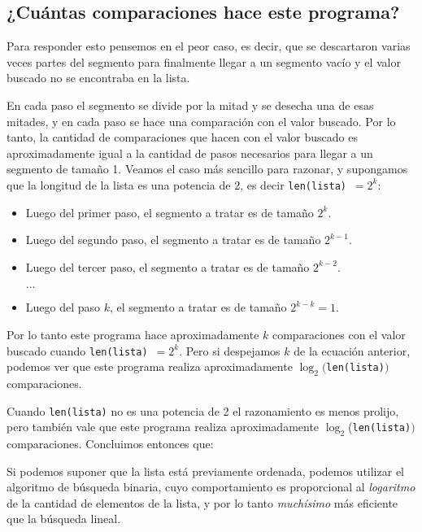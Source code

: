 
\subsection*{¿Cuántas comparaciones hace este programa?}

Para responder esto pensemos en el peor caso, es decir, que se descartaron
varias veces partes del segmento para finalmente llegar a un segmento vacío y
el valor buscado no se encontraba en la lista.

En cada paso el segmento se divide por la mitad y se desecha una de esas
mitades, y en cada paso se hace una comparación con el valor buscado. Por lo
tanto, la cantidad de comparaciones que hacen con el valor buscado es
aproximadamente igual a la cantidad de pasos necesarios para llegar a un
segmento de tamaño 1.
Veamos el caso más sencillo para razonar, y supongamos que la longitud de la
lista es una potencia de 2, es decir \lstinline+len(lista)+~$= 2^k$:

\begin{itemize}
\item Luego del primer paso, el segmento a tratar es de tamaño $2^k$.
\item Luego del segundo paso, el segmento a tratar es de tamaño $2^{k-1}$.
\item Luego del tercer paso, el segmento a tratar es de tamaño $2^{k-2}$.

$\ldots$

\item Luego del paso $k$, el segmento a tratar es de tamaño $2^{k-k}=1$.
\end{itemize}

Por lo tanto este programa hace aproximadamente $k$ comparaciones con el valor
buscado cuando \lstinline+len(lista)+~$= 2^k$.
Pero si despejamos $k$ de la ecuación anterior, podemos ver que este programa
realiza aproximadamente $\log_2($\lstinline+len(lista)+$)$ comparaciones.

Cuando \lstinline+len(lista)+ no es una potencia de 2 el razonamiento es menos
prolijo, pero también vale que este programa realiza aproximadamente
$\log_2$(\lstinline+len(lista)+$)$ comparaciones. Concluimos entonces que:

\begin{observacion}
Si podemos suponer que la lista está previamente ordenada, podemos utilizar el
algoritmo de búsqueda binaria, cuyo comportamiento es proporcional al
\emph{logaritmo} de la cantidad de elementos de la lista, y por lo tanto
\emph{muchísimo} más eficiente que la búsqueda lineal.
\end{observacion}

